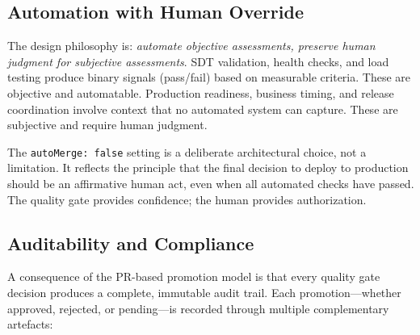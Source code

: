 \subsection{Automation with Human Override}
\label{subsec:automation-override}

The design philosophy is: \textit{automate objective assessments, preserve human judgment for subjective assessments}. SDT validation, health checks, and load testing produce binary signals (pass/fail) based on measurable criteria. These are objective and automatable. Production readiness, business timing, and release coordination involve context that no automated system can capture. These are subjective and require human judgment.

The \texttt{autoMerge: false} setting is a deliberate architectural choice, not a limitation. It reflects the principle that the final decision to deploy to production should be an affirmative human act, even when all automated checks have passed. The quality gate provides confidence; the human provides authorization.

\subsection{Auditability and Compliance}
\label{subsec:auditability}

A consequence of the PR-based promotion model is that every quality gate decision produces a complete, immutable audit trail. Each promotion---whether approved, rejected, or pending---is recorded through multiple complementary artefacts:

